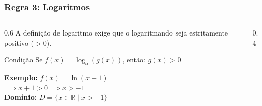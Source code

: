 \documentclass[9pt]{beamer}
\begin{document}
\begin{frame}
\frametitle{Regra 3: Logaritmos}
\begin{columns}
\begin{column}{0.6\textwidth}
A definição de logaritmo exige que o logaritmando seja estritamente positivo ($> 0$).

\begin{block}{Condição}
Se $f(x) = \log_b(g(x))$, então:
\Large \centering $g(x) > 0$
\end{block}

\textbf{Exemplo:} $f(x) = \ln(x + 1)$ \\
$\implies x + 1 > 0 \implies x > -1$ \\
\textbf{Domínio:} $D = \{x \in \mathbb{R} \mid x > -1\}$
\end{column}

\begin{column}{0.4\textwidth}
\centering
{}
\end{column}
\end{columns}
\end{frame}
\end{document}

